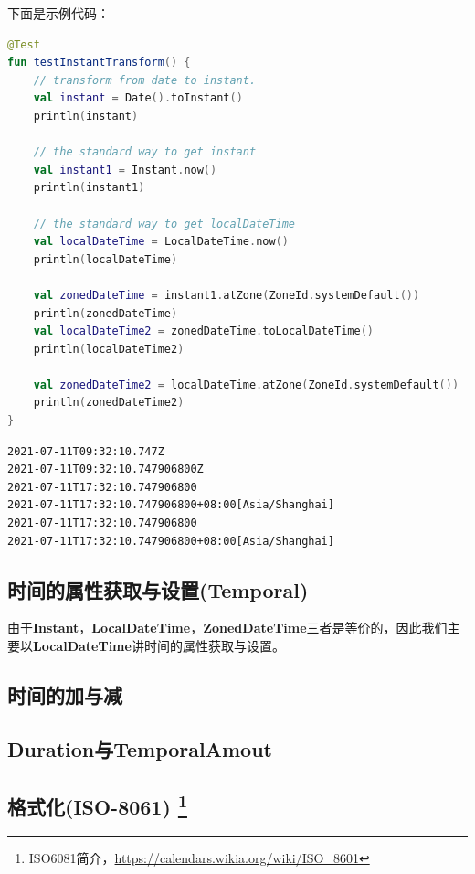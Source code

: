 \documentclass[cn,10pt,math=newtx,citestyle=gb7714-2015,bibstyle=gb7714-2015]{elegantbook}
\begin{document}
    下面是示例代码：

    \begin{lstlisting}[language=Kotlin]
@Test
fun testInstantTransform() {
    // transform from date to instant.
    val instant = Date().toInstant()
    println(instant)

    // the standard way to get instant
    val instant1 = Instant.now()
    println(instant1)

    // the standard way to get localDateTime
    val localDateTime = LocalDateTime.now()
    println(localDateTime)

    val zonedDateTime = instant1.atZone(ZoneId.systemDefault())
    println(zonedDateTime)
    val localDateTime2 = zonedDateTime.toLocalDateTime()
    println(localDateTime2)

    val zonedDateTime2 = localDateTime.atZone(ZoneId.systemDefault())
    println(zonedDateTime2)
}
    \end{lstlisting}

    \begin{lstlisting}[]
2021-07-11T09:32:10.747Z
2021-07-11T09:32:10.747906800Z
2021-07-11T17:32:10.747906800
2021-07-11T17:32:10.747906800+08:00[Asia/Shanghai]
2021-07-11T17:32:10.747906800
2021-07-11T17:32:10.747906800+08:00[Asia/Shanghai]        
    \end{lstlisting}

    \subsection{时间的属性获取与设置(Temporal)}

    由于\textbf{Instant}，\textbf{LocalDateTime}，\textbf{ZonedDateTime}三者是等价的，因此我们主要以\textbf{LocalDateTime}讲时间的属性获取与设置。


    \subsection{时间的加与减}

    \subsection{Duration与TemporalAmout}

    \subsection{格式化(ISO-8061)
    \footnote{
        ISO6081简介，\url{https://calendars.wikia.org/wiki/ISO_8601}
    }}
\end{document}

